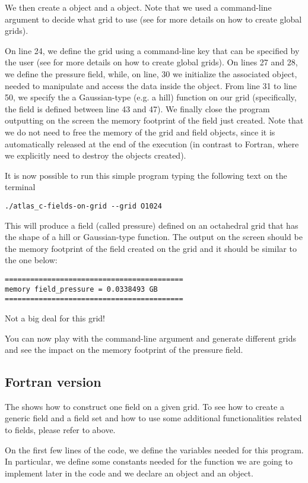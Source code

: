 We then create 
a  object and a  object.
Note that we used a command-line argument to decide 
what grid to use (see  for 
more details on how to create global grids).

On line 24, we define the grid using a command-line key 
that can be specified by the user (see 
for more details on how to create global grids).
On lines 27 and 28, we define the pressure field, while, 
on line, 30 we initialize the associated  
object, needed to manipulate and access the data inside the 
 object.
From line 31 to line 50, we specify the a Gaussian-type 
(e.g. a hill) function on our grid (specifically, the 
field is defined between line 43 and 47).
We finally close the program outputting on the screen 
the memory footprint of the field just created.
Note that we do not need to free the memory of the grid 
and field objects, since it is automatically released 
at the end of the execution (in contrast to Fortran, 
where we explicitly need to destroy the objects created).

It is now possible to run this simple program typing
the following text on the terminal
%
\begin{lstlisting}[style=BashStyle]
./atlas_c-fields-on-grid --grid O1024
\end{lstlisting}
% 
This will produce a field (called pressure) defined 
on an octahedral grid that has the shape of a hill 
or Gaussian-type function.
The output on the screen should be the memory footprint 
of the field created on the grid and it should be similar 
to the one below:
%
\begin{lstlisting}[style=BashStyle]
==========================================
memory field_pressure = 0.0338493 GB
==========================================
\end{lstlisting}
% 
Not a big deal for this grid!

You can now play with the command-line argument and 
generate different grids and see the impact on the 
memory footprint of the pressure field.



\subsection{Fortran version}
The  shows how to construct one field
on a given grid. To see how to create a generic field and 
a field set and how to use some additional functionalities 
related to fields, please refer to 
above. 
%

%
On the first few lines of the code, we define the variables
needed for this program. In particular, we define some constants 
needed for the function we are going to implement later in the 
code and we declare an  object and 
an  object.

